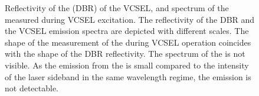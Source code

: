 
	\begin{figure}[tp]
		\centering
		\caption{Reflectivity of the \dbr (DBR) of the VCSEL, and spectrum of the \siv measured during VCSEL excitation. The reflectivity of the DBR and the VCSEL emission spectra are depicted with different scales. The shape of the measurement of the \siv during VCSEL operation coincides with the shape of the DBR reflectivity. The spectrum of the \siv is not visible. As the emission from the \siv is small compared to the intensity of the laser sideband in the same wavelength regime, the \sivs emission is not detectable.}
		\label{fig::dbr_vcsel}
	\end{figure}

